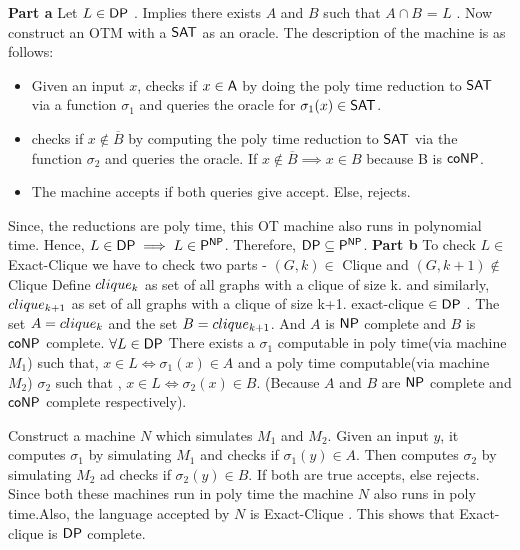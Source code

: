 \documentclass[12pt]{exam}
\begin{document}
\begin{questions}
\begin{solution}
\textbf{Part a} \newline
  Let $L \in {\ensuremath{\mathsf{DP}}}$ . Implies there exists $A$ and $B$ such that $A \cap B$ = $L$ . Now construct an OTM with a ${\mathsf{SAT}}$ as an oracle.
  The description of the machine is as follows:
  \begin{itemize}
   \item Given an input $x$, checks if $x \in {\ensuremath{\mathsf{A}}}$ by doing the poly time reduction to ${\mathsf{SAT}}$ via a function $\sigma_{1}$ and queries the oracle 
   for $\sigma_{1}(x) \in {\ensuremath{\mathsf{SAT}}}$.
   \item checks if $x \notin \overline{B}$ by computing the poly time reduction to ${\mathsf{SAT}}$ via the function $\sigma_{2}$ and queries the oracle.
   If $x \notin \overline{B} \implies x \in B$ because B is ${\mathsf{co}}{\mathsf{NP}}$.
   \item The machine accepts if both queries give accept. Else, rejects.
  \end{itemize}
  Since, the reductions are poly time, this OT machine also runs in polynomial time. Hence, $L \in {\ensuremath{\mathsf{DP}}} \implies L \in {\ensuremath{\mathsf{P}}}^{{\mathsf{NP}}}$.
  Therefore, ${\mathsf{DP}} \subseteq {\ensuremath{\mathsf{P}}}^{{\mathsf{NP}}}$. \newline
\textbf{Part b} \newline  
  To check $L \in $ {\sc Exact-Clique} we have to check two parts - $(G,k) \in$ {\sc Clique} and $(G,k+1) \notin$ {\sc Clique} 
  Define ${\sc clique_{k}}$ as set of all graphs with a clique of size k. and similarly, ${\sc clique_{k+1}}$ as set of all graphs with a clique
  of size k+1.
  {\sc exact-clique} $\in {\ensuremath{\mathsf{DP}}}$ . The set $A = {\sc clique_{k}}$ and the set $B = {\sc clique_{k+1}}$. And $A$ is ${\mathsf{NP}}$ complete and $B$ is ${\mathsf{co}}{\mathsf{NP}}$ complete.
  \newline
  $\forall L \in {\ensuremath{\mathsf{DP}}}$
  There exists a $\sigma_{1}$ computable in poly time(via machine $M_{1}$) such that, $x \in L \Leftrightarrow \sigma_{1}(x) \in A$ and
  a poly time computable(via machine $M_{2}$) $\sigma_{2}$ such that , $x \in L \Leftrightarrow \sigma_{2}(x) \in B$. (Because $A$ and $B$ are ${\mathsf{NP}}$ complete and ${\mathsf{co}}{\mathsf{NP}}$ complete
  respectively). \newline
  
  Construct a machine $N$ which simulates $M_{1}$ and $M_{2}$.
  Given an input $y$, it computes $\sigma_{1}$ by simulating $M_{1}$ and checks if $\sigma_{1}(y) \in A$. \newline
  Then computes $\sigma_{2}$ by simulating $M_{2}$ ad checks if $\sigma_{2}(y) \in B$.\newline
  If both are true accepts, else rejects.\newline
  Since both these machines run in poly time the machine $N$ also runs in poly time.Also, the language accepted by $N$ is {\sc Exact-Clique} .
  This shows that {\sc Exact-clique} is ${\mathsf{DP}}$ complete.
  

\end{solution}
\end{questions}
\end{document}
